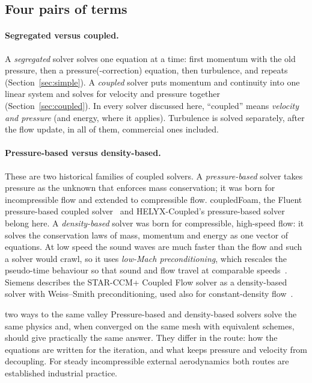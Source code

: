 \subsection{Four pairs of terms}\label{sec:cmp-words}

\paragraph{Segregated versus coupled.} A \emph{segregated} solver solves
one equation at a time: first momentum with the old pressure, then a
pressure(-correction) equation, then turbulence, and repeats
(Section~\ref{sec:simple}). A \emph{coupled} solver puts momentum and
continuity into one linear system and solves for velocity and pressure
together (Section~\ref{sec:coupled}). In every solver discussed here,
``coupled'' means \emph{velocity and pressure} (and energy, where it
applies). Turbulence is solved separately, after the flow update, in all of
them, commercial ones included.

\paragraph{Pressure-based versus density-based.} These are two historical
families of coupled solvers. A \emph{pressure-based} solver takes pressure
as the unknown that enforces mass conservation; it was born for
incompressible flow and extended to compressible flow. coupledFoam, the
Fluent pressure-based coupled solver~\cite{cmp-ChenPrzekwas2010,cmp-Fluent12TG}
and HELYX-Coupled's pressure-based solver~\cite{cmp-HelyxCoupled} belong
here. A \emph{density-based} solver was born for compressible, high-speed
flow: it solves the conservation laws of mass, momentum and energy as one
vector of equations. At low speed the sound waves are much faster than the
flow and such a solver would crawl, so it uses \emph{low-Mach
preconditioning}, which rescales the pseudo-time behaviour so that sound
and flow travel at comparable speeds~\cite{cmp-WeissSmith1995,Weiss1999}.
Siemens describes the STAR-CCM+ Coupled Flow solver as a density-based
solver with Weiss--Smith preconditioning, used also for constant-density
flow~\cite{cmp-StarCoupledDoc,cmp-StarCoupledGPU2023}.

\begin{intuition}{two ways to the same valley}
  Pressure-based and density-based solvers solve the same physics and,
  when converged on the same mesh with equivalent schemes, should give
  practically the same answer. They differ in the route: how the
  equations are written for the iteration, and what keeps pressure and
  velocity from decoupling. For steady incompressible external
  aerodynamics both routes are established industrial practice.
\end{intuition}

